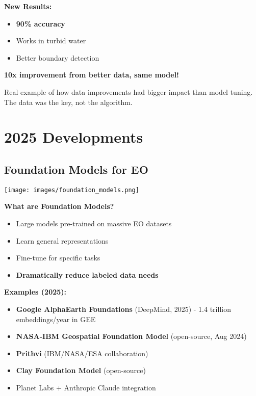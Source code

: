 \documentclass[
  letterpaper,
  DIV=11,
  numbers=noendperiod]{scrartcl}
\providecommand{\tightlist}{%
  \setlength{\itemsep}{0pt}\setlength{\parskip}{0pt}}
\begin{document}
\textbf{New Results:}

\begin{itemize}
\tightlist
\item
  \textbf{90\% accuracy}
\item
  Works in turbid water
\item
  Better boundary detection
\end{itemize}

\textbf{10x improvement from better data, same model!}

Real example of how data improvements had bigger impact than model
tuning. The data was the key, not the algorithm.

\section{2025 Developments}\label{developments}

\subsection{Foundation Models for EO}\label{foundation-models-for-eo}

\begin{center}
\texttt{[image: images/foundation\_models.png]}
\end{center}

\textbf{What are Foundation Models?}

\begin{itemize}
\tightlist
\item
  Large models pre-trained on massive EO datasets
\item
  Learn general representations
\item
  Fine-tune for specific tasks
\item
  \textbf{Dramatically reduce labeled data needs}
\end{itemize}

\textbf{Examples (2025):}

\begin{itemize}
\tightlist
\item
  \textbf{Google AlphaEarth Foundations} (DeepMind, 2025) - 1.4 trillion
  embeddings/year in GEE
\item
  \textbf{NASA-IBM Geospatial Foundation Model} (open-source, Aug 2024)
\item
  \textbf{Prithvi} (IBM/NASA/ESA collaboration)
\item
  \textbf{Clay Foundation Model} (open-source)
\item
  Planet Labs + Anthropic Claude integration
\end{itemize}
\end{document}
